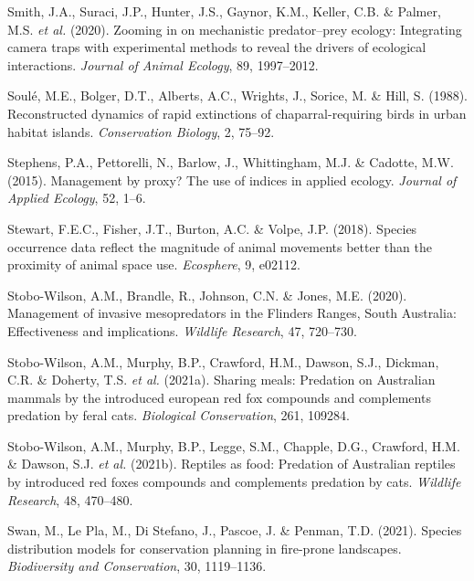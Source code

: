 \documentclass[11pt,a4paper,titlepage,twoside,openright]{style/unimelbthesis}
\begin{document}
\begin{mainmatter}
\leavevmode\hypertarget{ref-smith2020zooming}{}%
Smith, J.A., Suraci, J.P., Hunter, J.S., Gaynor, K.M., Keller, C.B. \& Palmer, M.S. \emph{et al.} (2020). Zooming in on mechanistic predator--prey ecology: Integrating camera traps with experimental methods to reveal the drivers of ecological interactions. \emph{Journal of Animal Ecology}, 89, 1997--2012.

\leavevmode\hypertarget{ref-soule1988reconstructed}{}%
Soulé, M.E., Bolger, D.T., Alberts, A.C., Wrights, J., Sorice, M. \& Hill, S. (1988). Reconstructed dynamics of rapid extinctions of chaparral-requiring birds in urban habitat islands. \emph{Conservation Biology}, 2, 75--92.

\leavevmode\hypertarget{ref-stephens2015management}{}%
Stephens, P.A., Pettorelli, N., Barlow, J., Whittingham, M.J. \& Cadotte, M.W. (2015). Management by proxy? The use of indices in applied ecology. \emph{Journal of Applied Ecology}, 52, 1--6.

\leavevmode\hypertarget{ref-stewart2018species}{}%
Stewart, F.E.C., Fisher, J.T., Burton, A.C. \& Volpe, J.P. (2018). Species occurrence data reflect the magnitude of animal movements better than the proximity of animal space use. \emph{Ecosphere}, 9, e02112.

\leavevmode\hypertarget{ref-stobo2020management}{}%
Stobo-Wilson, A.M., Brandle, R., Johnson, C.N. \& Jones, M.E. (2020). Management of invasive mesopredators in the Flinders Ranges, South Australia: Effectiveness and implications. \emph{Wildlife Research}, 47, 720--730.

\leavevmode\hypertarget{ref-stobo2021sharing}{}%
Stobo-Wilson, A.M., Murphy, B.P., Crawford, H.M., Dawson, S.J., Dickman, C.R. \& Doherty, T.S. \emph{et al.} (2021a). Sharing meals: Predation on Australian mammals by the introduced european red fox compounds and complements predation by feral cats. \emph{Biological Conservation}, 261, 109284.

\leavevmode\hypertarget{ref-stobo2021reptiles}{}%
Stobo-Wilson, A.M., Murphy, B.P., Legge, S.M., Chapple, D.G., Crawford, H.M. \& Dawson, S.J. \emph{et al.} (2021b). Reptiles as food: Predation of Australian reptiles by introduced red foxes compounds and complements predation by cats. \emph{Wildlife Research}, 48, 470--480.

\leavevmode\hypertarget{ref-swan2021species}{}%
Swan, M., Le Pla, M., Di Stefano, J., Pascoe, J. \& Penman, T.D. (2021). Species distribution models for conservation planning in fire-prone landscapes. \emph{Biodiversity and Conservation}, 30, 1119--1136.


\end{mainmatter}
\end{document}
